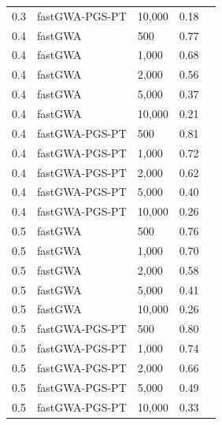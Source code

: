 \documentclass[10pt]{article}
\begin{document}
\begin{table}[!htb]
\begin{tabular}{rllrr}
  0.3 & fastGWA-PGS-PT & 10,000 & 0.18 \\ 
  0.4 & fastGWA & 500 & 0.77 \\ 
  0.4 & fastGWA & 1,000 & 0.68 \\ 
  0.4 & fastGWA & 2,000 & 0.56 \\ 
  0.4 & fastGWA & 5,000 & 0.37 \\ 
  0.4 & fastGWA & 10,000 & 0.21 \\ 
  0.4 & fastGWA-PGS-PT & 500 & 0.81 \\ 
  0.4 & fastGWA-PGS-PT & 1,000 & 0.72 \\ 
  0.4 & fastGWA-PGS-PT & 2,000 & 0.62 \\ 
  0.4 & fastGWA-PGS-PT & 5,000 & 0.40 \\ 
  0.4 & fastGWA-PGS-PT & 10,000 & 0.26 \\ 
  0.5 & fastGWA & 500 & 0.76 \\ 
  0.5 & fastGWA & 1,000 & 0.70 \\ 
  0.5 & fastGWA & 2,000 & 0.58 \\ 
  0.5 & fastGWA & 5,000 & 0.41 \\ 
  0.5 & fastGWA & 10,000 & 0.26 \\ 
  0.5 & fastGWA-PGS-PT & 500 & 0.80 \\ 
  0.5 & fastGWA-PGS-PT & 1,000 & 0.74 \\ 
  0.5 & fastGWA-PGS-PT & 2,000 & 0.66 \\ 
  0.5 & fastGWA-PGS-PT & 5,000 & 0.49 \\ 
  0.5 & fastGWA-PGS-PT & 10,000 & 0.33 \\ 
   \hline
\end{tabular}
\end{table}
\end{document}
